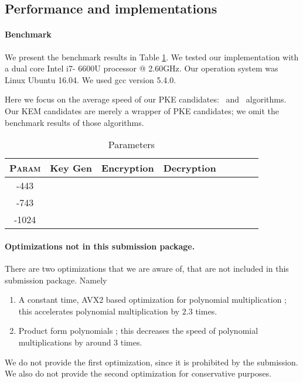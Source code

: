 \documentclass{llncs}
\newcommand{\ntru}{{\sf{NTRU}}}
\newcommand{\ntrupke}{{\sf{ntru-pke}}}
\newcommand{\ssntrupke}{{\sf{ss-ntru-pke}}}
\newcommand{\<}{\langle}
\renewcommand{\>}{\rangle}
\begin{document}
\subsection{Performance and implementations}
\paragraph{Benchmark}
We present the benchmark results in Table \ref{tab:bench}.
We tested our implementation with a dual core Intel i7-
6600U processor @ 2.60GHz. Our operation system was
Linux Ubuntu 16.04. We used gcc version 5.4.0.

Here we focus on the average speed of our 
PKE candidates: \ntrupke~and \ssntrupke~algorithms. Our KEM candidates are merely a 
wrapper of PKE candidates; we omit the benchmark results 
of those algorithms.
\begin{table}
\centering
\caption{Parameters}
\label{tab:bench}
\begin{tabular}{|c|c|c|c|c|c|c|c|}\hline
\textsc{Param} &Key Gen & Encryption & Decryption\\\hline\hline
\ntru-443 & & & \\%
\ntru-743 & & &\\%
\ntru-1024 & & &\\\hline
\end{tabular}
\end{table}


\paragraph{Optimizations not in this submission package.}
There are two optimizations that we are aware of, that are not 
included in this submission package. Namely
\begin{enumerate}
\item A constant time, AVX2 based optimization for polynomial multiplication \cite{ntrutoc}; this accelerates polynomial multiplication by $2.3$ times.
\item Product form polynomials \cite{DBLP:conf/ctrsa/HoffsteinPSSWZ17}; this decreases the speed of
polynomial multiplications by around 3 times.
\end{enumerate}
We do not provide the first optimization, since it is prohibited
by the submission. We also do not provide the second optimization
for conservative purposes. 
\end{document}

